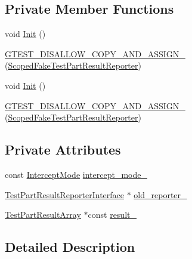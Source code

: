 \subsection*{\-Private \-Member \-Functions}
\begin{DoxyCompactItemize}
\item 
void \hyperlink{classtesting_1_1ScopedFakeTestPartResultReporter_a1e3b6d38df0786ccf7f938d60e386aae}{\-Init} ()
\item 
\hyperlink{classtesting_1_1ScopedFakeTestPartResultReporter_a534cd7ad0e39e08d2aa8426d3f167e8a}{\-G\-T\-E\-S\-T\-\_\-\-D\-I\-S\-A\-L\-L\-O\-W\-\_\-\-C\-O\-P\-Y\-\_\-\-A\-N\-D\-\_\-\-A\-S\-S\-I\-G\-N\-\_\-} (\hyperlink{classtesting_1_1ScopedFakeTestPartResultReporter}{\-Scoped\-Fake\-Test\-Part\-Result\-Reporter})
\item 
void \hyperlink{classtesting_1_1ScopedFakeTestPartResultReporter_a1e3b6d38df0786ccf7f938d60e386aae}{\-Init} ()
\item 
\hyperlink{classtesting_1_1ScopedFakeTestPartResultReporter_a534cd7ad0e39e08d2aa8426d3f167e8a}{\-G\-T\-E\-S\-T\-\_\-\-D\-I\-S\-A\-L\-L\-O\-W\-\_\-\-C\-O\-P\-Y\-\_\-\-A\-N\-D\-\_\-\-A\-S\-S\-I\-G\-N\-\_\-} (\hyperlink{classtesting_1_1ScopedFakeTestPartResultReporter}{\-Scoped\-Fake\-Test\-Part\-Result\-Reporter})
\end{DoxyCompactItemize}
\subsection*{\-Private \-Attributes}
\begin{DoxyCompactItemize}
\item 
const \hyperlink{classtesting_1_1ScopedFakeTestPartResultReporter_a1d75549697022f869ab9d184916077d2}{\-Intercept\-Mode} \hyperlink{classtesting_1_1ScopedFakeTestPartResultReporter_ac41a6872b1cb8a2d43546199dd59ae6e}{intercept\-\_\-mode\-\_\-}
\item 
\hyperlink{classtesting_1_1TestPartResultReporterInterface}{\-Test\-Part\-Result\-Reporter\-Interface} $\ast$ \hyperlink{classtesting_1_1ScopedFakeTestPartResultReporter_a6931c672d50d49d040805ae729d9ac1c}{old\-\_\-reporter\-\_\-}
\item 
\hyperlink{classtesting_1_1TestPartResultArray}{\-Test\-Part\-Result\-Array} $\ast$const \hyperlink{classtesting_1_1ScopedFakeTestPartResultReporter_a520bca09fbdcb2a2a36fea6b1c438b53}{result\-\_\-}
\end{DoxyCompactItemize}


\subsection{\-Detailed \-Description}


